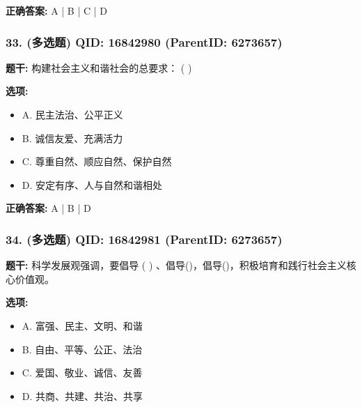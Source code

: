 \documentclass[12pt,UTF8]{ctexart}
\begin{document}
\textbf{正确答案:}
A | B | C | D

\vspace{0.3em}\hrulefill\vspace{0.7em}

\subsubsection*{33. (多选题) \small QID: 16842980 (ParentID: 6273657)}

\textbf{题干:}
构建社会主义和谐社会的总要求： ( )



\textbf{选项:}
\begin{itemize}[leftmargin=*]

  \item A. 民主法治、公平正义

  \item B. 诚信友爱、充满活力

  \item C. 尊重自然、顺应自然、保护自然

  \item D. 安定有序、人与自然和谐相处

\end{itemize}

\textbf{正确答案:}
A | B | D

\vspace{0.3em}\hrulefill\vspace{0.7em}

\subsubsection*{34. (多选题) \small QID: 16842981 (ParentID: 6273657)}

\textbf{题干:}
科学发展观强调，要倡导 ( ) 、倡导()，倡导()，积极培育和践行社会主义核心价值观。



\textbf{选项:}
\begin{itemize}[leftmargin=*]

  \item A. 富强、民主、文明、和谐

  \item B. 自由、平等、公正、法治

  \item C. 爱国、敬业、诚信、友善

  \item D. 共商、共建、共治、共享

\end{itemize}
\end{document}
